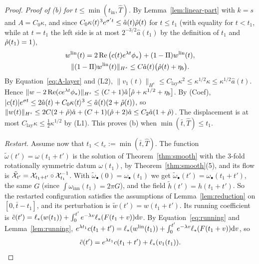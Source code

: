 \begin{proof}
\emph{Proof of (b) for $t\le\min(t_{\mathrm{in}},\hat T)$.} By
Lemma~\ref{lem:linear-part} with $k=s$ and $A=C_0\kappa$, and since
$C_0\kappa\langle t\rangle^3e^{\sigma't}\le\hat a(t)\hat\rho(t)$ for $t\le t_1$ (with
equality for $t<t_1$, while at $t=t_1$ the left side is at most
$2^{-3/2}\hat a(t_1)$ by the definition of $t_1$ and $\hat\rho(t_1)=1$),
\[
\begin{gathered}
w^{\mathrm{lin}}(t)=2\Re\big(c(t)e^{\lambda t}\phi_*\big)+(1-\Pi)w^{\mathrm{lin}}(t),\\
\|(1-\Pi)w^{\mathrm{lin}}(t)\|_{H^s}\le C\hat a(t)\big(\hat\rho(t)+\eta_b\big).
\end{gathered}
\]
By Equation~\eqref{eq:A-layer} and (L2),
$\|v_1(t)\|_{H^s}\le C_{\mathrm{lay}}\kappa^2\le\kappa^{1/2}\kappa\le\kappa^{1/2}\hat a(t)$. Hence
$\|w-2\Re(ce^{\lambda t}\phi_*)\|_{H^s}\le(C+1)\hat a\big[\hat\rho+\kappa^{1/2}+\eta_b\big]$.
By (Coef), $|c(t)|e^{\sigma t}\le2\hat a(t)+C_0\kappa\langle t\rangle^3\le\hat a(t)(2+\hat\rho(t))$,
so $\|w(t)\|_{H^s}\le2C(2+\hat\rho)\hat a+(C+1)(\hat\rho+2)\hat a\le C_2\hat a(1+\hat\rho)$.
The displacement is at most $C_{\mathrm{lay}}\kappa\le\frac12\kappa^{1/2}$ by (L1).
This proves (b) when $\min(\bar t,\hat T)\le t_1$.

\emph{Restart.} Assume now that $t_1<t_e:=\min(\bar t,\hat T)$. The function
$\tilde\omega(t')=\omega(t_1+t')$ is the solution of Theorem~\ref{thm:smooth} with the
$3$-fold rotationally symmetric datum $\omega(t_1)$, by Theorem~\ref{thm:smooth}\textup{(5)}, and its
flow is $\tilde{\mathcal{X}}_{t'}=\mathcal{X}_{t_1+t'}\circ\mathcal{X}_{t_1}^{-1}$. With
$\tilde\omega_\bullet(0)=\omega_\bullet(t_1)$ we get $\tilde\omega_\bullet(t')=\omega_\bullet(t_1+t')$,
the same $G$ (since $\int\omega_{\mathrm{inn}}(t_1)=2\pi G$), and the field
$\tilde h(t')=h(t_1+t')$. So the restarted configuration satisfies the assumptions of
Lemma~\ref{lem:reduction} on $[0,\bar t-t_1]$, and its perturbation is
$\tilde w(t')=w(t_1+t')$. Its running coefficient is
$\tilde c(t')=\ell_*(w(t_1))+\int_0^{t'}e^{-\lambda v}\ell_*(F(t_1+v))\dd v$. By
Equation~\eqref{eq:running} and Lemma~\ref{lem:running},
$e^{\lambda t_1}c(t_1+t')=\ell_*(w^{\mathrm{lin}}(t_1))+\int_0^{t'}e^{-\lambda v}\ell_*(F(t_1+v))\dd v$, so
\begin{equation}
\label{eq:A-restart}
\tilde c(t')=e^{\lambda t_1}c(t_1+t')+\ell_*(v_1(t_1)).
\end{equation}


\end{proof}
